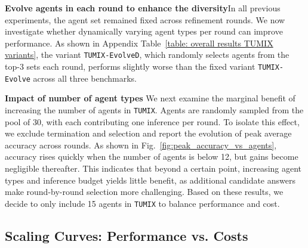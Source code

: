 \textbf{Evolve agents in each round to enhance the diversity}\quad In all previous experiments, the agent set remained fixed across refinement rounds. We now investigate whether dynamically varying agent types per round can improve performance. As shown in Appendix Table~\ref{table: overall results TUMIX variants}, the variant \texttt{TUMIX-EvolveD}, which randomly selects agents from the top-3 sets each round, performs slightly worse than the fixed variant \texttt{TUMIX-Evolve} across all three benchmarks.

\textbf{Impact of number of agent types}\quad 
We next examine the marginal benefit of increasing the number of agents in \texttt{TUMIX}. Agents are randomly sampled from the pool of 30, with each contributing one inference per round. To isolate this effect, we exclude termination and selection and report the evolution of peak average accuracy across rounds. As shown in Fig.~\ref{fig:peak_accuracy_vs_agents}, accuracy rises quickly when the number of agents is below 12, but gains become negligible thereafter. This indicates that beyond a certain point, increasing agent types and inference budget yields little benefit, as additional candidate answers make round-by-round selection more challenging. Based on these results, we decide to only include 15 agents in \texttt{TUMIX} to balance performance and cost.

\subsection{Scaling Curves: Performance vs. Costs}

